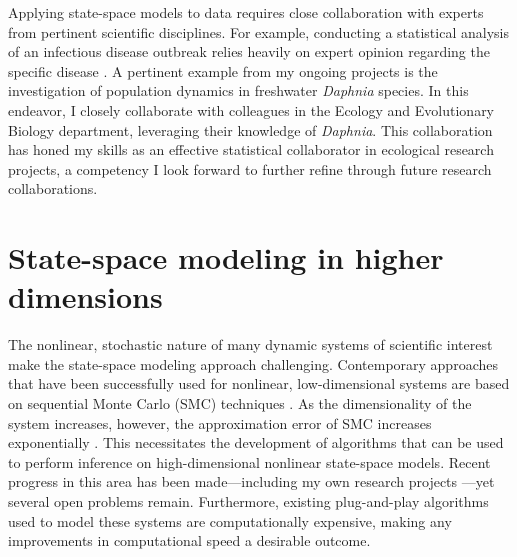 \documentclass{article}
\begin{document}
Applying state-space models to data requires close collaboration with experts from pertinent scientific disciplines.
For example, conducting a statistical analysis of an infectious disease outbreak relies heavily on expert opinion regarding the specific disease \cite{wheeler24}.
A pertinent example from my ongoing projects is the investigation of population dynamics in freshwater \emph{Daphnia} species.
In this endeavor, I closely collaborate with colleagues in the Ecology and Evolutionary Biology department, leveraging their knowledge of \emph{Daphnia}.
This collaboration has honed my skills as an effective statistical collaborator in ecological research projects, a competency I look forward to further refine through future research collaborations.


\section{State-space modeling in higher dimensions}\label{sec:methods}

The nonlinear, stochastic nature of many dynamic systems of scientific interest make the state-space modeling approach challenging.
Contemporary approaches that have been successfully used for nonlinear, low-dimensional systems are based on sequential Monte Carlo (SMC) techniques \cite{ionides06,andrieu10,ionides15}.
As the dimensionality of the system increases, however, the approximation error of SMC increases exponentially \cite{bengtsson08,snyder08}.
This necessitates the development of algorithms that can be used to perform inference on high-dimensional nonlinear state-space models.
Recent progress in this area has been made---including my own research projects \cite{ionides22,wheeler24}---yet several open problems remain.
Furthermore, existing plug-and-play algorithms used to model these systems are computationally expensive, making any improvements in computational speed a desirable outcome.
\end{document}
